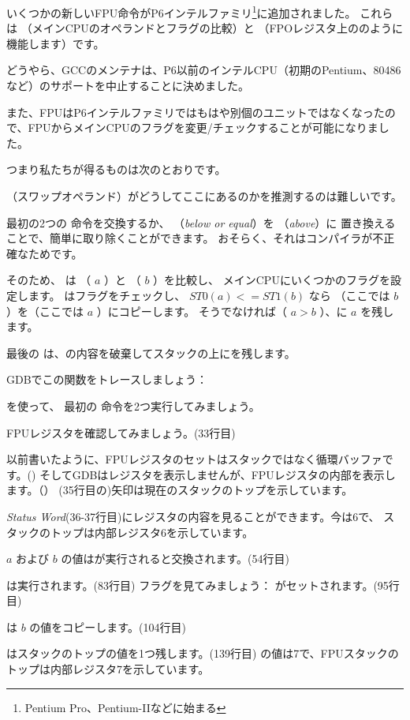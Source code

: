 ﻿
\label{gcc481_o3}

いくつかの新しいFPU命令がP6インテルファミリ\footnote{Pentium Pro、Pentium-IIなどに始まる}に追加されました。 
これらは  （メインCPUのオペランドとフラグの比較）と
 （FPOレジスタ上ののように機能します）です。

どうやら、GCCのメンテナは、P6以前のインテルCPU（初期のPentium、80486など）のサポートを中止することに決めました。

また、FPUはP6インテルファミリではもはや別個のユニットではなくなったので、FPUからメインCPUのフラグを変更/チェックすることが可能になりました。

つまり私たちが得るものは次のとおりです。



 （スワップオペランド）がどうしてここにあるのかを推測するのは難しいです。

最初の2つの \FLD 命令を交換するか、  （\emph{below or equal}）を  （\emph{above}）に
置き換えることで、簡単に取り除くことができます。 
おそらく、それはコンパイラが不正確なためです。

そのため、  は  （ $a$ ）と （ $b$ ）を比較し、
メインCPUにいくつかのフラグを設定します。 
はフラグをチェックし、 $ST0 (a) <= ST1 (b)$ なら
（ここでは $b$ ）を（ここでは $a$ ）にコピーします。
そうでなければ（ $a>b$ ）、に $a$ を残します。

最後の \FSTP は、の内容を破棄してスタックの上にを残します。

GDBでこの関数をトレースしましょう：



を使って、
最初の \FLD 命令を2つ実行してみましょう。

FPUレジスタを確認してみましょう。(33行目)

以前書いたように、FPUレジスタのセットはスタックではなく循環バッファです。()
そしてGDBはレジスタを表示しませんが、FPUレジスタの内部を表示します。（）
(35行目の)矢印は現在のスタックのトップを示しています。

\emph{Status Word}(36-37行目)にレジスタの内容を見ることができます。今は6で、
スタックのトップは内部レジスタ6を示しています。

$a$ および $b$ の値はが実行されると交換されます。(54行目)

は実行されます。(83行目)
フラグを見てみましょう： \CF がセットされます。(95行目)

 は $b$ の値をコピーします。(104行目)

\FSTP はスタックのトップの値を1つ残します。(139行目)
の値は7で、FPUスタックのトップは内部レジスタ7を示しています。
